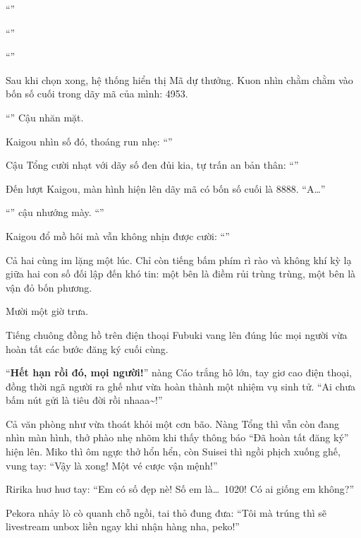 \documentclass[../main.tex]{subfiles}
\begin{document}
``''

``''

``''

Sau khi chọn xong, hệ thống hiển thị Mã dự thưởng. Kuon nhìn chằm chằm vào bốn số cuối trong dãy mã của mình: 4953.

``'' Cậu nhăn mặt.

Kaigou nhìn số đó, thoáng run nhẹ: ``''

Cậu Tổng cười nhạt với dãy số đen đủi kia, tự trấn an bản thân: ``''

Đến lượt Kaigou, màn hình hiện lên dãy mã có bốn số cuối là 8888. ``A\dots''

``'' cậu nhướng mày. ``''

Kaigou đổ mồ hôi mà vẫn không nhịn được cười: ``''

Cả hai cùng im lặng một lúc. Chỉ còn tiếng bấm phím rì rào và không khí kỳ lạ giữa hai con số đối lập đến khó tin: một bên là điềm rủi trùng trùng, một bên là vận đỏ bốn phương.

\ct

Mười một giờ trưa.

Tiếng chuông đồng hồ trên điện thoại Fubuki vang lên đúng lúc mọi người vừa hoàn tất các bước đăng ký cuối cùng.

``\textbf{Hết hạn rồi đó, mọi người!}'' nàng Cáo trắng hô lớn, tay giơ cao điện thoại, đồng thời ngã người ra ghế như vừa hoàn thành một nhiệm vụ sinh tử. ``Ai chưa bấm nút gửi là tiêu đời rồi nhaaa\~{}!''

Cả văn phòng như vừa thoát khỏi một cơn bão. Nàng Tổng thì vẫn còn đang nhìn màn hình, thở phào nhẹ nhõm khi thấy thông báo ``Đã hoàn tất đăng ký'' hiện lên. Miko thì ôm ngực thở hổn hển, còn Suisei thì ngồi phịch xuống ghế, vung tay: ``Vậy là xong! Một vé cược vận mệnh!''

Ririka huơ huơ tay: ``Em có số đẹp nè! Số em là\dots\ 1020! Có ai giống em không?''

Pekora nhảy lò cò quanh chỗ ngồi, tai thỏ đung đưa: ``Tôi mà trúng thì sẽ livestream unbox liền ngay khi nhận hàng nha, peko!''
\end{document}
